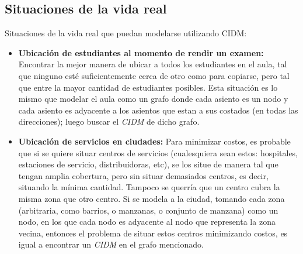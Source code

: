 




\newpage
\subsection{Situaciones de la vida real}

Situaciones de la vida real que puedan modelarse utilizando CIDM:

\begin{itemize}
	\item \textbf{Ubicación de estudiantes al momento de rendir un examen:} Encontrar la mejor manera de ubicar a todos los estudiantes en el aula, tal que ninguno esté suficientemente cerca de otro como para copiarse, pero tal que entre la mayor cantidad de estudiantes posibles. Esta situación es lo mismo que modelar el aula como un grafo donde cada asiento es un nodo y cada asiento es adyacente a los asientos que estan a sus costados (en todas las direcciones); luego buscar el \emph{CIDM} de dicho grafo.
	
	\item \textbf{Ubicación de servicios en ciudades:} Para minimizar costos, es probable que si se quiere situar centros de servicios (cualesquiera sean estos: hospitales, estaciones de servicio, distribuidoras, etc), se los situe de manera tal que tengan amplia cobertura, pero sin situar demasiados centros, es decir, situando la mínima cantidad. Tampoco se querría que un centro cubra la misma zona que otro centro. Si se modela a la ciudad, tomando cada zona (arbitraria, como barrios, o manzanas, o conjunto de manzana) como un nodo, en los que cada nodo es adyacente al nodo que representa la zona vecina, entonces el problema de situar estos centros minimizando costos, es igual a encontrar un \emph{CIDM} en el grafo mencionado.
\end{itemize}
